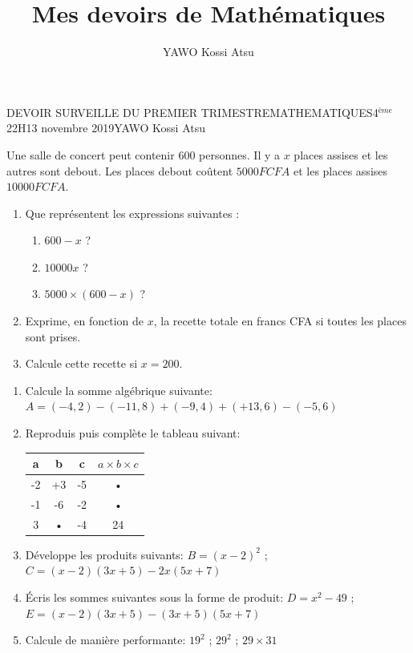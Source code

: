 \documentclass[12pt,a4paper]{book}
\author{YAWO Kossi Atsu}
\title{Mes devoirs de Mathématiques}
\newcommand{\prof}{YAWO Kossi Atsu}
\newcommand{\matiere}{MATHEMATIQUES}
\newcommand{\classe}{4$^{ème}$}
\begin{document}
\begin{devoir}{DEVOIR SURVEILLE DU PREMIER TRIMESTRE}{\matiere}{\classe}{2}{2H}{13 novembre 2019}{\prof}
\begin{exo}[4]
Une salle de concert peut contenir $600$ personnes. Il y a $x$ places assises et les
autres sont debout. Les places debout coûtent $5000 F CFA$ et les places assises $10000 F CFA$.
\begin{enumerate}
\item Que représentent les expressions
suivantes : 
\begin{enumerate}
\item $600-x$ ?
\item $10000x$ ?
\item $5000\times(600-x)$ ?
\end{enumerate}
\item Exprime, en fonction de $x$, la recette totale en francs CFA si toutes les places sont prises.
\item Calcule cette recette si $x = 200$.
\end{enumerate}
\end{exo}

\vspace{1cm}

\begin{exo}[6]
\begin{enumerate}
\item Calcule la somme algébrique suivante:
$A=(-4,2)-(-11,8)+(-9,4)+(+13,6)-(-5,6)$
\item Reproduis puis complète le tableau suivant:\\
\begin{tabular}{|c|c|c|c|}
\hline 
a & b & c & $a \times b \times c$ \\ 
\hline 
-2 & +3 & -5 & • \\ 
\hline 
-1 & -6 & -2 & • \\ 
\hline 
3 & • & -4 & 24 \\ 
\hline 
\end{tabular} 
\item Développe les produits suivants:
$B=(x-2)^2$  \qquad ; \qquad $C=(x-2)(3x+5)-2x(5x+7)$
\item Écris les sommes suivantes sous la forme de produit:
$D=x^2-49$  \qquad ; \qquad $E=(x-2)(3x+5)-(3x+5)(5x+7)$
\item Calcule de manière performante:
$19^2$ \qquad ; \qquad $29^2$ \qquad ; \qquad $29 \times 31$ 
\end{enumerate}


\end{exo}
\end{devoir}
\end{document}
